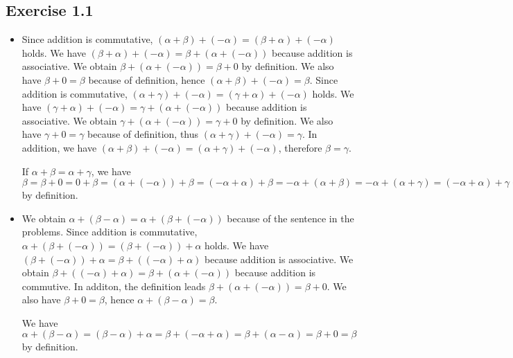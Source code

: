 \documentclass{article}
\begin{document}
\subsection{Exercise 1.1}
\begin{itemize}
  \item[(b)]Since addition is commutative, $(\alpha + \beta) + (-\alpha) = (\beta + \alpha) + (-\alpha)$ holds.
    We have $(\beta + \alpha) + (-\alpha) = \beta + (\alpha + (-\alpha))$ because addition is associative.
    We obtain $\beta + (\alpha + (-\alpha)) = \beta + 0$ by definition.
    We also have $\beta + 0 = \beta$ because of definition,
    hence $(\alpha + \beta) + (-\alpha) = \beta$.
    Since addition is commutative, $(\alpha + \gamma) + (-\alpha) = (\gamma + \alpha) + (-\alpha)$ holds.
    We have $(\gamma + \alpha) + (-\alpha) = \gamma + (\alpha + (-\alpha))$ because addition is associative.
    We obtain $\gamma + (\alpha + (-\alpha)) = \gamma + 0$ by definition.
    We also have $\gamma + 0 = \gamma$ because of definition,
    thus $(\alpha + \gamma) + (-\alpha) = \gamma$.
    In addition, we have $(\alpha + \beta) + (-\alpha) = (\alpha + \gamma) + (-\alpha)$,
    therefore $\beta = \gamma$.
    
    {\color{red}
      If $\alpha + \beta = \alpha + \gamma$, we have $\beta = \beta + 0 = 0 + \beta = (\alpha + (-\alpha)) + \beta = (-\alpha + \alpha) + \beta = -\alpha + (\alpha + \beta) = -\alpha + (\alpha + \gamma) = (-\alpha + \alpha) + \gamma = (\alpha + (-\alpha)) + \gamma = 0 + \gamma = \gamma + 0 = \gamma$ by definition.
    }
  \item[(c)]We obtain $\alpha + (\beta - \alpha) = \alpha + (\beta + (-\alpha))$ because of the sentence in the problems.
    Since addition is commutative, $\alpha + (\beta + (-\alpha)) = (\beta + (-\alpha)) + \alpha$ holds.
    We have $(\beta + (-\alpha)) + \alpha = \beta + ((-\alpha) + \alpha)$ because addition is associative.
    We obtain $\beta + ((-\alpha) + \alpha) = \beta + (\alpha + (-\alpha))$ because addition is commutive.
    In additon, the definition leads $\beta + (\alpha + (-\alpha)) = \beta + 0$.
    We also have $\beta + 0 = \beta$,
    hence $\alpha + (\beta - \alpha) = \beta$.
    
    {\color{red}
      We have $\alpha + (\beta - \alpha) = (\beta - \alpha) + \alpha = \beta + (-\alpha + \alpha) = \beta + (\alpha - \alpha) = \beta + 0 = \beta$ by definition.
    }
    

\end{itemize}
\end{document}
